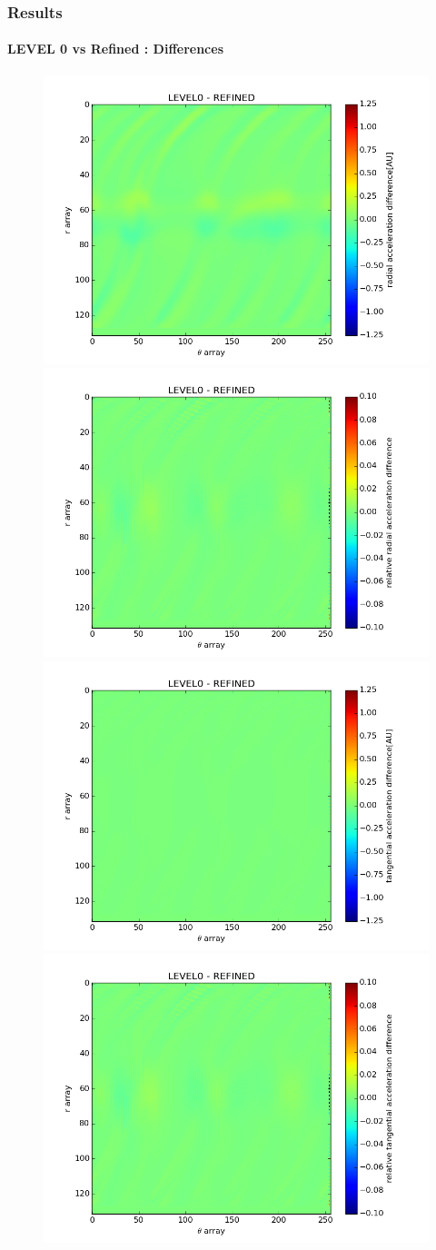 \documentclass{beamer}
\begin{document}
\begin{frame}
\frametitle{Results}
\framesubtitle{LEVEL 0 vs Refined : Differences}
\begin{figure}
\includegraphics[width = .5\textwidth]{./diff_abs_lvl0_ref_radial.png}
\includegraphics[width = .5\textwidth]{./diff_rel_lvl0_ref_radial.png}
\newline
\includegraphics[width = .5\textwidth]{./diff_abs_lvl0_ref_tangential.png}
\includegraphics[width = .5\textwidth]{./diff_rel_lvl0_ref_tangential.png}
\end{figure} 
\end{frame}
\end{document}

